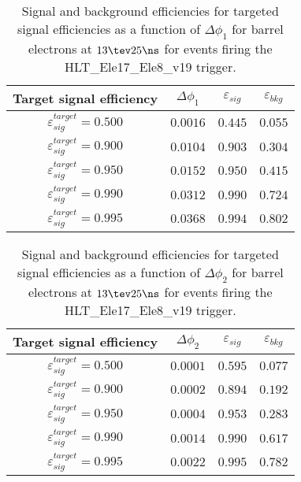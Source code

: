\clearpage

\begin{table}[!bht]
  \begin{center}
    \begin{tabular}{cccc}
      \hline
      Target signal efficiency & $\Delta\phi_1$ & $\varepsilon_{sig}$ & $\varepsilon_{bkg}$ \\ 
      \hline
      $\varepsilon_{sig}^{target} = 0.500$ & $  0.0016$ & $0.445$ & $0.055$ \\
      $\varepsilon_{sig}^{target} = 0.900$ & $  0.0104$ & $0.903$ & $0.304$ \\
      $\varepsilon_{sig}^{target} = 0.950$ & $  0.0152$ & $0.950$ & $0.415$ \\
      $\varepsilon_{sig}^{target} = 0.990$ & $  0.0312$ & $0.990$ & $0.724$ \\
      $\varepsilon_{sig}^{target} = 0.995$ & $  0.0368$ & $0.994$ & $0.802$ \\
      \hline
    \end{tabular}
    \caption{Signal and background efficiencies for targeted signal efficiencies as a function of $\Delta\phi_1$ for barrel electrons at $13\tev 25\ns$ for events firing the HLT\_Ele17\_Ele8\_v19 trigger.}
    \label{tab:eff_rej_phi1_beam_13_25_trigger_17_8_B}
  \end{center}
\end{table}

\clearpage

\begin{table}[!bht]
  \begin{center}
    \begin{tabular}{cccc}
      \hline
      Target signal efficiency & $\Delta\phi_2$ & $\varepsilon_{sig}$ & $\varepsilon_{bkg}$ \\ 
      \hline
      $\varepsilon_{sig}^{target} = 0.500$ & $  0.0001$ & $0.595$ & $0.077$ \\
      $\varepsilon_{sig}^{target} = 0.900$ & $  0.0002$ & $0.894$ & $0.192$ \\
      $\varepsilon_{sig}^{target} = 0.950$ & $  0.0004$ & $0.953$ & $0.283$ \\
      $\varepsilon_{sig}^{target} = 0.990$ & $  0.0014$ & $0.990$ & $0.617$ \\
      $\varepsilon_{sig}^{target} = 0.995$ & $  0.0022$ & $0.995$ & $0.782$ \\
      \hline
    \end{tabular}
    \caption{Signal and background efficiencies for targeted signal efficiencies as a function of $\Delta\phi_2$ for barrel electrons at $13\tev 25\ns$ for events firing the HLT\_Ele17\_Ele8\_v19 trigger.}
    \label{tab:eff_rej_phi2_beam_13_25_trigger_17_8_B}
  \end{center}
\end{table}

